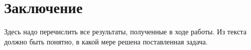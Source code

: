 \section{Заключение}
\label{sec:Chapter4} 

Здесь надо перечислить все результаты, полученные в ходе работы. Из текста
должно быть понятно, в какой мере решена поставленная задача.
